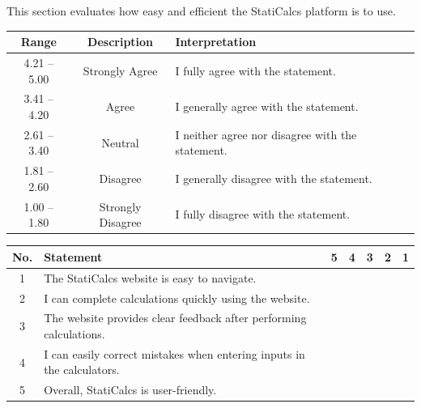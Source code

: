 This section evaluates how easy and efficient the StatiCalcs platform is to use.  



\begin{table}[h!]
\centering
\renewcommand{\arraystretch}{1.5}
\begin{tabular}{|c|c|p{6cm}|}
\hline
\textbf{Range} & \textbf{Description} & \textbf{Interpretation} \\ \hline
4.21 -- 5.00 & Strongly Agree & I fully agree with the statement. \\ \hline
3.41 -- 4.20 & Agree & I generally agree with the statement. \\ \hline
2.61 -- 3.40 & Neutral & I neither agree nor disagree with the statement. \\ \hline
1.81 -- 2.60 & Disagree & I generally disagree with the statement. \\ \hline
1.00 -- 1.80 & Strongly Disagree & I fully disagree with the statement. \\ \hline
\end{tabular}
\renewcommand{\arraystretch}{1}
\end{table}

\vspace{0.3cm}

\begin{tabular}{c p{7cm} c c c c c}
\hline
\textbf{No.} & \textbf{Statement} & \textbf{5} & \textbf{4} & \textbf{3} & \textbf{2} & \textbf{1} \\
\hline
1 & The StatiCalcs website is easy to navigate. & \fbox{\rule{0pt}{0.2cm}\rule{0.2cm}{0pt}} & \fbox{\rule{0pt}{0.2cm}\rule{0.2cm}{0pt}} & \fbox{\rule{0pt}{0.2cm}\rule{0.2cm}{0pt}} & \fbox{\rule{0pt}{0.2cm}\rule{0.2cm}{0pt}} & \fbox{\rule{0pt}{0.2cm}\rule{0.2cm}{0pt}} \\
2 & I can complete calculations quickly using the website. & \fbox{\rule{0pt}{0.2cm}\rule{0.2cm}{0pt}} & \fbox{\rule{0pt}{0.2cm}\rule{0.2cm}{0pt}} & \fbox{\rule{0pt}{0.2cm}\rule{0.2cm}{0pt}} & \fbox{\rule{0pt}{0.2cm}\rule{0.2cm}{0pt}} & \fbox{\rule{0pt}{0.2cm}\rule{0.2cm}{0pt}} \\
3 & The website provides clear feedback after performing calculations. & \fbox{\rule{0pt}{0.2cm}\rule{0.2cm}{0pt}} & \fbox{\rule{0pt}{0.2cm}\rule{0.2cm}{0pt}} & \fbox{\rule{0pt}{0.2cm}\rule{0.2cm}{0pt}} & \fbox{\rule{0pt}{0.2cm}\rule{0.2cm}{0pt}} & \fbox{\rule{0pt}{0.2cm}\rule{0.2cm}{0pt}} \\
4 & I can easily correct mistakes when entering inputs in the calculators. & \fbox{\rule{0pt}{0.2cm}\rule{0.2cm}{0pt}} & \fbox{\rule{0pt}{0.2cm}\rule{0.2cm}{0pt}} & \fbox{\rule{0pt}{0.2cm}\rule{0.2cm}{0pt}} & \fbox{\rule{0pt}{0.2cm}\rule{0.2cm}{0pt}} & \fbox{\rule{0pt}{0.2cm}\rule{0.2cm}{0pt}} \\
5 & Overall, StatiCalcs is user-friendly. & \fbox{\rule{0pt}{0.2cm}\rule{0.2cm}{0pt}} & \fbox{\rule{0pt}{0.2cm}\rule{0.2cm}{0pt}} & \fbox{\rule{0pt}{0.2cm}\rule{0.2cm}{0pt}} & \fbox{\rule{0pt}{0.2cm}\rule{0.2cm}{0pt}} & \fbox{\rule{0pt}{0.2cm}\rule{0.2cm}{0pt}} \\
\hline

\end{tabular}
\vspace{1cm}
